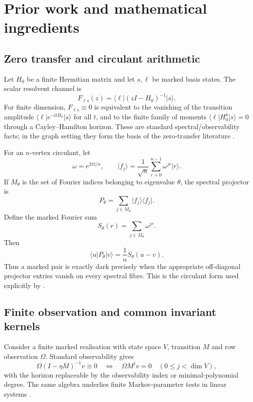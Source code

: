 \documentclass[11pt]{article}
\theoremstyle{definition}
\theoremstyle{remark}
\newcommand{\ii}{\mathrm{i}}
\newcommand{\ket}[1]{\lvert #1\rangle}
\newcommand{\bra}[1]{\langle #1\rvert}
\begin{document}
\section{Prior work and mathematical ingredients}\label{sec:prior}

\subsection{Zero transfer and circulant arithmetic}

Let $H_0$ be a finite Hermitian matrix and let $s,\ell$ be marked basis states. The scalar resolvent channel is
\begin{equation}\label{eq:channel}
F_{\ell s}(z)=\bra{\ell}(zI-H_0)^{-1}\ket{s}.
\end{equation}
For finite dimension, $F_{\ell s}\equiv0$ is equivalent to the vanishing of the transition amplitude $\bra{\ell}e^{-\ii tH_0}\ket{s}$ for all $t$, and to the finite family of moments $\bra{\ell}H_0^k\ket{s}=0$ through a Cayley--Hamilton horizon. These are standard spectral/observability facts; in the graph setting they form the basis of the zero-transfer literature \parencite{Sett2019,CoutinhoGodsil2021,SongLin2026}.

For an $n$-vertex circulant, let
\[
\omega=e^{2\pi\ii/n},\qquad
\ket{f_j}=\frac{1}{\sqrt n}\sum_{r=0}^{n-1}\omega^{jr}\ket r.
\]
If $M_\theta$ is the set of Fourier indices belonging to eigenvalue $\theta$, the spectral projector is
\[
P_\theta=\sum_{j\in M_\theta}\ket{f_j}\bra{f_j}.
\]
Define the marked Fourier sum
\begin{equation}\label{eq:SongSum}
S_\theta(r)=\sum_{j\in M_\theta}\omega^{jr}.
\end{equation}
Then
\begin{equation}\label{eq:projector-entry}
\bra uP_\theta\ket v=\frac1n S_\theta(u-v).
\end{equation}
Thus a marked pair is exactly dark precisely when the appropriate off-diagonal projector entries vanish on every spectral fibre. This is the circulant form used explicitly by \textcite{SongLin2026}.

\subsection{Finite observation and common invariant kernels}

Consider a finite marked realisation with state space $V$, transition $M$ and row observation $\Omega$. Standard observability gives
\begin{equation}\label{eq:finiteobs}
\Omega(I-\eta M)^{-1}v\equiv0
\quad\Longleftrightarrow\quad
\Omega M^jv=0\quad(0\le j<\dim V),
\end{equation}
with the horizon replaceable by the observability index or minimal-polynomial degree. The same algebra underlies finite Markov-parameter tests in linear systems \parencite{Kalman1963}.
\end{document}
